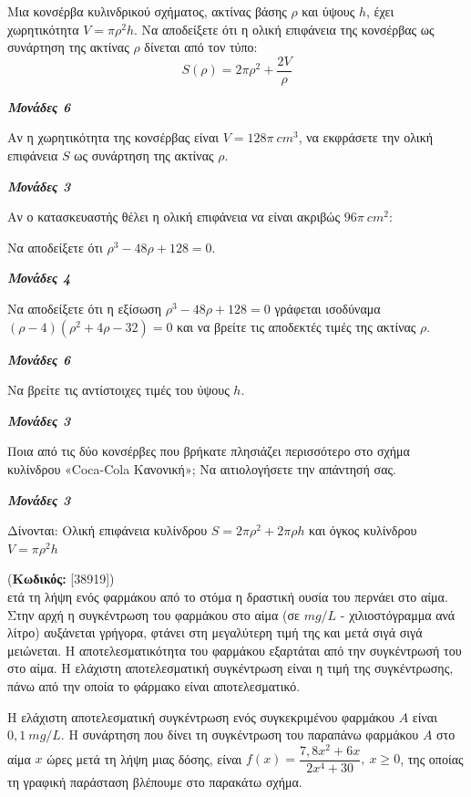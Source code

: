 \documentclass[11pt,a4paper,twoside]{book}
\newcounter{askhsh}[chapter]
\renewcommand{\theaskhsh}{
	\bf{\titlefont{\Large{\thechapter}}.\arabic{askhsh}}
}
\newcommand{\Askhsh}[2]{\refstepcounter{askhsh}{\titlefont{Άσκηση\theaskhsh} - \textcolor{maincolor}{ΘΕΜΑ #2}} (\small{\textbf{Κωδικός:} #1})\\}{}
\newcommand{\monades}[1]{
\hspace*{\fill}
\textbf{\textit{\textcolor{maincolor}{Μονάδες #1}}}}
\begin{document}
\begin{alist}
\item Μια κονσέρβα κυλινδρικού σχήματος, ακτίνας βάσης $\rho$ και ύψους $h$, έχει χωρητικότητα $V = \pi\rho^2 h$. Να αποδείξετε ότι η ολική επιφάνεια της κονσέρβας ως συνάρτηση της ακτίνας $\rho$ δίνεται από τον τύπο:
\begin{equation*}S(\rho) = 2\pi\rho^2 + \dfrac{2V}{\rho}\end{equation*}
\monades{6}
\item Αν η χωρητικότητα της κονσέρβας είναι $V = 128\pi\ cm^3$, να εκφράσετε την ολική επιφάνεια $S$ ως συνάρτηση της ακτίνας $\rho$.
\monades{3}
\item Αν ο κατασκευαστής θέλει η ολική επιφάνεια να είναι ακριβώς $96\pi\ cm^2$:
\begin{rlist}
\item Να αποδείξετε ότι $\rho^3 - 48\rho + 128 = 0$.
\monades{4}
\item Να αποδείξετε ότι η εξίσωση $\rho^3 - 48\rho + 128 = 0$ γράφεται ισοδύναμα $(\rho - 4)(\rho^2 + 4\rho - 32) = 0$ και να βρείτε τις αποδεκτές τιμές της ακτίνας $\rho$.
\monades{6}
\item Να βρείτε τις αντίστοιχες τιμές του ύψους $h$.
\monades{3}
\end{rlist}
\item Ποια από τις δύο κονσέρβες που βρήκατε πλησιάζει περισσότερο στο σχήμα κυλίνδρου «Coca-Cola Κανονική»; Να αιτιολογήσετε την απάντησή σας.
\monades{3}

Δίνονται: Ολική επιφάνεια κυλίνδρου $S = 2\pi\rho^{2} + 2\pi\rho h$ και όγκος κυλίνδρου $V = \pi\rho^{2}h$
\end{alist}
\vspace{4mm}

\Askhsh{[38919]}
Μετά τη λήψη ενός φαρμάκου από το στόμα η δραστική ουσία του περνάει στο αίμα. Στην αρχή η συγκέντρωση του φαρμάκου στο αίμα (σε $mg/L$ - χιλιοστόγραμμα ανά λίτρο) αυξάνεται γρήγορα, φτάνει στη μεγαλύτερη τιμή της και μετά σιγά σιγά μειώνεται. Η αποτελεσματικότητα του φαρμάκου εξαρτάται από την συγκέντρωσή του στο αίμα. Η ελάχιστη αποτελεσματική συγκέντρωση είναι η τιμή της συγκέντρωσης, πάνω από την οποία το φάρμακο είναι αποτελεσματικό.

Η ελάχιστη αποτελεσματική συγκέντρωση ενός συγκεκριμένου φαρμάκου $Α$ είναι $0,1\ mg/L$. Η συνάρτηση που δίνει τη συγκέντρωση του παραπάνω φαρμάκου $Α$ στο αίμα $x$ ώρες μετά τη λήψη μιας δόσης, είναι $f(x) = \dfrac{7,8x^{2} + 6x}{2x^{4} + 30},\ x \geq 0$, της οποίας τη γραφική παράσταση βλέπουμε στο παρακάτω σχήμα.
\end{document}
